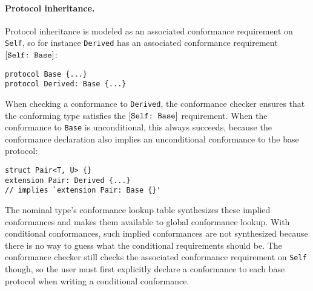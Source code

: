 \documentclass[../generics]{subfiles}
\begin{document}
\paragraph{Protocol inheritance.}
Protocol inheritance is modeled as an associated conformance requirement on \texttt{Self}, so for instance \verb|Derived| has an associated conformance requirement $[\texttt{Self:~Base}]$:
\begin{Verbatim}
protocol Base {...}
protocol Derived: Base {...}
\end{Verbatim}
When checking a conformance to \texttt{Derived}, the conformance checker ensures that the conforming type satisfies the $[\texttt{Self:~Base}]$ requirement. When the conformance to \texttt{Base} is unconditional, this always succeeds, because the conformance declaration also implies an unconditional conformance to the base protocol:
\begin{Verbatim}
struct Pair<T, U> {}
extension Pair: Derived {...}
// implies `extension Pair: Base {}'
\end{Verbatim}
The nominal type's conformance lookup table synthesizes these implied conformances and makes them available to global conformance lookup. With conditional conformances, such implied conformances are not synthesized because there is no way to guess what the conditional requirements should be. The conformance checker still checks the associated conformance requirement on \texttt{Self} though, so the user must first explicitly declare a conformance to each base protocol when writing a conditional conformance.
\end{document}
